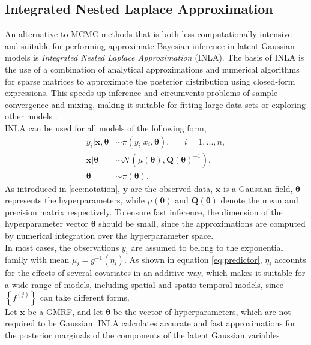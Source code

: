 \subsection{Integrated Nested Laplace Approximation}
An alternative to MCMC methods that is both less computationally intensive and suitable for performing approximate Bayesian inference in latent Gaussian models is \textit{Integrated Nested Laplace Approximation} (INLA). The basis of INLA is the use of a combination of analytical approximations and numerical algorithms for sparse matrices to approximate the posterior distribution using closed-form expressions. This speeds up inference and circumvents problems of sample convergence and mixing, making it suitable for fitting large data sets or exploring other models \autocite[][]{rue2009approximate}.  \\
INLA can be used for all models of the following form,
\begin{align*}
    y_i|\pmb{x},\pmb{\theta} &\sim \pi\left(y_i|x_i,\pmb{\theta}\right), \hspace{20pt} i=1,...,n,\\
    \pmb{x}|\pmb{\theta} &\sim \mathcal{N}\left(\mu\left(\pmb{\theta}\right), \pmb{Q}\left(\pmb{\theta}\right)^{-1}\right), \\
    \pmb{\theta} &\sim \pi\left(\pmb{\theta}\right).
\end{align*}
As introduced in \autoref{sec:notation}, $\pmb{y}$ are the observed data, $\pmb{x}$ is a Gaussian field, $\pmb{\theta}$ represents the hyperparameters, while $\mu\left(\pmb{\theta}\right)$ and $\pmb{Q}\left(\pmb{\theta}\right)$ denote the mean and precision matrix respectively. To ensure fast inference, the dimension of the hyperparameter vector $\pmb{\theta}$ should be small, since the approximations are computed by numerical integration over the hyperparameter space. \\
In most cases, the observations $y_i$ are assumed to belong to the exponential family with mean $\mu_i=g^{-1}\left(\eta_i\right)$. As shown in equation \eqref{eq:predictor}, $\eta_i$ accounts for the effects of several covariates in an additive way, which makes it suitable for a wide range of models, including spatial and spatio-temporal models, since $\left\lbrace f^{(j)}\right\rbrace$ can take different forms. \\
Let $\pmb{x}$ be a GMRF, and let $\pmb{\theta}$ be the vector of hyperparameters, which are not required to be Gaussian. INLA calculates accurate and fast approximations for the posterior marginals of the components of the latent Gaussian variables
